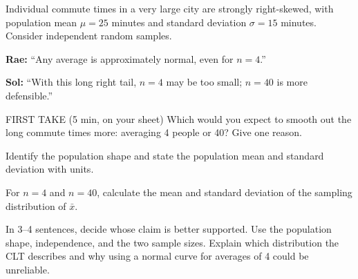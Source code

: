 \documentclass[14pt]{extarticle}
\begin{document}
\pagestyle{empty}


\noindent\begin{minipage}[t]{0.57\linewidth}
\vspace{0pt}
Individual commute times in a very large city are strongly right-skewed, with population mean $\mu=25$ minutes and standard deviation $\sigma=15$ minutes. Consider independent random samples.\par\smallskip \textbf{Rae:} ``Any average is approximately normal, even for $n=4$.''\par \textbf{Sol:} ``With this long right tail, $n=4$ may be too small; $n=40$ is more defensible.''\par
\end{minipage}\hfill
\begin{minipage}[t]{0.40\linewidth}
\vspace{0pt}
\begin{center}
\end{center}
\end{minipage}

\begin{firsttakebox}{FIRST TAKE (5 min, on your sheet)}
Which would you expect to smooth out the long commute times more: averaging 4 people or 40? Give one reason.
\end{firsttakebox}

\begin{description}[leftmargin=1.15in, labelwidth=1in, itemsep=2pt, topsep=2pt]
  \item[\dokbadge{1}~(a)] Identify the population shape and state the population mean and standard deviation with units.
  \item[\dokbadge{2}~(b)] For $n=4$ and $n=40$, calculate the mean and standard deviation of the sampling distribution of $\bar{x}$.
  \item[\dokbadge{3}~(c)] In 3--4 sentences, decide whose claim is better supported. Use the population shape, independence, and the two sample sizes. Explain which distribution the CLT describes and why using a normal curve for averages of 4 could be unreliable.
\end{description}
\end{document}
